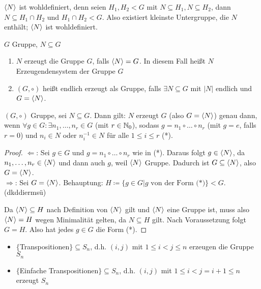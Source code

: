\documentclass[12pt,a4paper]{scrartcl}
\begin{document}
\begin{bem}
	$\langle N\rangle$ ist wohldefiniert, denn seien $H_1, H_2<G$ mit $N\subseteq H_1, N\subseteq H_2$, dann $N\subseteq H_1\cap H_2$ und $H_1\cap H_2<G$. Also existiert kleinste Untergruppe, die $N$ enthält; $\langle N\rangle$ ist wohldefiniert.
\end{bem}

\begin{defi}
	$G$ Gruppe, $N\subseteq G$
	\begin{enumerate}
		\item $N$ erzeugt die Gruppe $G$, falls $\langle N\rangle = G$. In diesem Fall heißt $N$ Erzeugendensystem der Gruppe $G$
		\item $(G,\circ)$ heißt endlich erzeugt als Gruppe, falls $\exists N\subseteq G$ mit $|N|$ endlich und $G = \langle N\rangle$.
	\end{enumerate}
\end{defi}

\begin{bem}
	$(G,\circ)$ Gruppe, sei $N\subseteq G$. Dann gilt: $N$ erzeugt $G$ (also $G = \langle N\rangle$) genau dann, wenn $\forall g\in G : \exists n_1,\dots,n_r\in G$ (mit $r\in \mathbb N_0$), sodass $g = n_1\circ \dots \circ n_r$ (mit $g=e$, falls $r=0$) und $n_i\in N$ oder $n_i^{-1}\in N$ für alle $1\leq i\leq r$ (*).
\end{bem}

\begin{proof}
	\glqq$\Leftarrow$\grqq: Sei $g\in G$ und $g = n_1\circ\dots \circ n_r$ wie in (*). Daraus folgt $g\in \langle N\rangle$, da $n_1,\dots,n_r\in \langle N\rangle$ und dann auch $g$, weil $\langle N\rangle$ Gruppe. Dadurch ist $G\subseteq \langle N\rangle$, also $G = \langle N\rangle$.\\
	\glqq$\Rightarrow$\grqq: Sei $G = \langle N\rangle$. Behauptung: $H\coloneqq\{g\in G| g \mbox{ von der Form (*)}\}<G$. (dkddiermsü)
	
	Da $\langle N\rangle\subseteq H$ nach Definition von $\langle N\rangle$ gilt und $\langle N\rangle$ eine Gruppe ist, muss also $\langle N\rangle = H$ wegen Minimalität gelten, da $N\subseteq H$ gilt. Nach Voraussetzung folgt $G = H$. Also hat jedes $g\in G$ die Form (*).
\end{proof}

\begin{bsp}
	\leavevmode
	\begin{itemize}
		\item $\{$Transpositionen$\}\subseteq S_n$, d.h. $(i,j)$ mit $1\leq i<j\leq n$ erzeugen die Gruppe $S_n$
		\item $\{$Einfache Transpositionen$\}\subseteq S_n$, d.h. $(i,j)$ mit $1\leq i<j=i+1\leq n$ erzeugt $S_n$
	\end{itemize}
	
\end{bsp}
\end{document}
